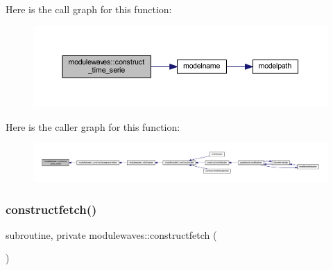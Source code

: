 Here is the call graph for this function\+:\nopagebreak
\begin{figure}[H]
\begin{center}
\leavevmode
\includegraphics[width=350pt]{namespacemodulewaves_a86eae20876164ce3f5e09fbb27e80f64_cgraph}
\end{center}
\end{figure}
Here is the caller graph for this function\+:\nopagebreak
\begin{figure}[H]
\begin{center}
\leavevmode
\includegraphics[width=350pt]{namespacemodulewaves_a86eae20876164ce3f5e09fbb27e80f64_icgraph}
\end{center}
\end{figure}
\mbox{\label{namespacemodulewaves_ae74bdf3f12b1f411d55edf56bb284dc1}} 
\subsubsection{\texorpdfstring{constructfetch()}{constructfetch()}}
{\footnotesize\ttfamily subroutine, private modulewaves\+::constructfetch (\begin{DoxyParamCaption}{ }\end{DoxyParamCaption})\hspace{0.3cm}{\ttfamily [private]}}

